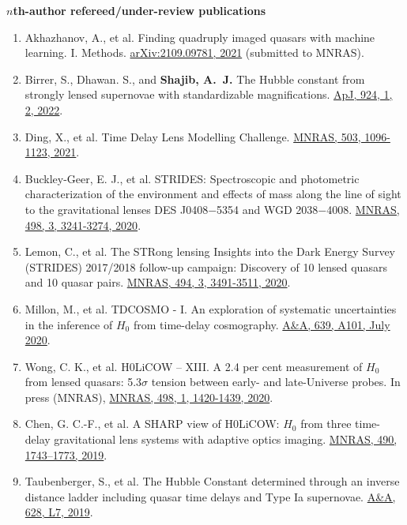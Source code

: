 \documentclass[margin, line]{res}
\begin{document}
\begin{resume}
\textbf{$n$th-author refereed/under-review publications}
\begin{enumerate}
	\item Akhazhanov, A., et al. Finding quadruply imaged quasars with machine learning. I. Methods. \href{https://arxiv.org/abs/2109.09781}{arXiv:2109.09781, 2021} (submitted to MNRAS).
	\item Birrer, S., Dhawan. S., and \textbf{Shajib, A.~J.} The Hubble constant from strongly lensed supernovae with standardizable magnifications. \href{https://iopscience.iop.org/article/10.3847/1538-4357/ac323a}{ApJ, 924, 1, 2, 2022}.
	\item Ding, X., et al. Time Delay Lens Modelling Challenge. \href{https://ui.adsabs.harvard.edu/abs/2021MNRAS.503.1096D/abstract}{MNRAS, 503, 1096-1123, 2021}.
	\item Buckley-Geer, E. J., et al. STRIDES: Spectroscopic and photometric characterization of the environment and effects of mass along the line of sight to the gravitational lenses DES J0408$-$5354 and WGD 2038$-$4008. \href{https://ui.adsabs.harvard.edu/abs/2020MNRAS.498.3241B/abstract}{MNRAS, 498, 3, 3241-3274, 2020}.
	\item Lemon, C., et al. The STRong lensing Insights into the Dark Energy Survey (STRIDES) 2017/2018 follow-up campaign: Discovery of 10 lensed quasars and 10 quasar pairs. \href{https://doi.org/10.1093/mnras/staa652}{MNRAS, 494, 3, 3491-3511, 2020}.
	\item Millon, M., et al. TDCOSMO - I. An exploration of systematic uncertainties in the inference of $H_0$ from time-delay cosmography. \href{https://doi.org/10.1051/0004-6361/201937351}{A\&A, 639, A101, July 2020}.
	\item Wong, C. K., et al. H0LiCOW – XIII. A 2.4 per cent measurement of $H_0$ from lensed quasars: 5.3$\sigma$ tension between early- and late-Universe probes. In press (MNRAS), \href{https://doi.org/10.1093/mnras/stz3094}{MNRAS, 498, 1, 1420-1439, 2020}.
	\item Chen, G. C.-F., et al. A SHARP view of H0LiCOW: $H_0$ from three time-delay gravitational lens systems with adaptive optics imaging. \href{https://academic.oup.com/mnras/article/doi/10.1093/mnras/stz2547/5568378/}{MNRAS, 490, 1743--1773, 2019}.
	\item Taubenberger, S., et al. The Hubble Constant determined through an inverse distance ladder including quasar time delays and Type Ia supernovae. \href{https://www.aanda.org/articles/aa/abs/2019/08/aa35980-19/aa35980-19.html}{A\&A, 628, L7, 2019}.

\end{enumerate}
\end{resume}
\end{document}
